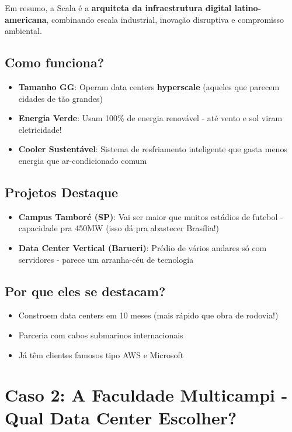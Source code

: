 \documentclass{article}
\begin{document}
\noindent
Em resumo, a Scala é a \textbf{arquiteta da infraestrutura digital latino-americana}, combinando escala industrial, inovação disruptiva e compromisso ambiental.
\subsection*{Como funciona?}
\begin{itemize}[leftmargin=*]
    \item \textbf{Tamanho GG}: Operam data centers \textbf{hyperscale} (aqueles que parecem cidades de tão grandes)
    \item \textbf{Energia Verde}: Usam 100\% de energia renovável - até vento e sol viram eletricidade!
    \item \textbf{Cooler Sustentável}: Sistema de resfriamento inteligente que gasta menos energia que ar-condicionado comum
\end{itemize}

\subsection*{Projetos Destaque}
\begin{itemize}
    \item \textbf{Campus Tamboré (SP)}: Vai ser maior que muitos estádios de futebol - capacidade pra 450MW (isso dá pra abastecer Brasília!)
    \item \textbf{Data Center Vertical (Barueri)}: Prédio de vários andares só com servidores - parece um arranha-céu de tecnologia
\end{itemize}

\subsection*{Por que eles se destacam?}
\begin{itemize}
    \item Constroem data centers em 10 meses (mais rápido que obra de rodovia!)
    \item Parceria com cabos submarinos internacionais
    \item Já têm clientes famosos tipo AWS e Microsoft
\end{itemize}

\section*{Caso 2: A Faculdade Multicampi - Qual Data Center Escolher?}
\end{document}
